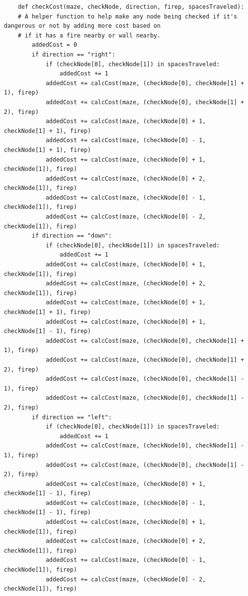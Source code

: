 \documentclass[11pt]{article}
\begin{document}
\begin{verbatim}
    def checkCost(maze, checkNode, direction, firep, spacesTraveled):
    # A helper function to help make any node being checked if it's dangerous or not by adding more cost based on
    # if it has a fire nearby or wall nearby.
        addedCost = 0
        if direction == "right":
            if (checkNode[0], checkNode[1]) in spacesTraveled:
                addedCost += 1
            addedCost += calcCost(maze, (checkNode[0], checkNode[1] + 1), firep)
            addedCost += calcCost(maze, (checkNode[0], checkNode[1] + 2), firep)
            addedCost += calcCost(maze, (checkNode[0] + 1, checkNode[1] + 1), firep)
            addedCost += calcCost(maze, (checkNode[0] - 1, checkNode[1] + 1), firep)
            addedCost += calcCost(maze, (checkNode[0] + 1, checkNode[1]), firep)
            addedCost += calcCost(maze, (checkNode[0] + 2, checkNode[1]), firep)
            addedCost += calcCost(maze, (checkNode[0] - 1, checkNode[1]), firep)
            addedCost += calcCost(maze, (checkNode[0] - 2, checkNode[1]), firep)
        if direction == "down":
            if (checkNode[0], checkNode[1]) in spacesTraveled:
                addedCost += 1
            addedCost += calcCost(maze, (checkNode[0] + 1, checkNode[1]), firep)
            addedCost += calcCost(maze, (checkNode[0] + 2, checkNode[1]), firep)
            addedCost += calcCost(maze, (checkNode[0] + 1, checkNode[1] + 1), firep)
            addedCost += calcCost(maze, (checkNode[0] + 1, checkNode[1] - 1), firep)
            addedCost += calcCost(maze, (checkNode[0], checkNode[1] + 1), firep)
            addedCost += calcCost(maze, (checkNode[0], checkNode[1] + 2), firep)
            addedCost += calcCost(maze, (checkNode[0], checkNode[1] - 1), firep)
            addedCost += calcCost(maze, (checkNode[0], checkNode[1] - 2), firep)
        if direction == "left":
            if (checkNode[0], checkNode[1]) in spacesTraveled:
                addedCost += 1
            addedCost += calcCost(maze, (checkNode[0], checkNode[1] - 1), firep)
            addedCost += calcCost(maze, (checkNode[0], checkNode[1] - 2), firep)
            addedCost += calcCost(maze, (checkNode[0] + 1, checkNode[1] - 1), firep)
            addedCost += calcCost(maze, (checkNode[0] - 1, checkNode[1] - 1), firep)
            addedCost += calcCost(maze, (checkNode[0] + 1, checkNode[1]), firep)
            addedCost += calcCost(maze, (checkNode[0] + 2, checkNode[1]), firep)
            addedCost += calcCost(maze, (checkNode[0] - 1, checkNode[1]), firep)
            addedCost += calcCost(maze, (checkNode[0] - 2, checkNode[1]), firep)

\end{verbatim}
\end{document}
